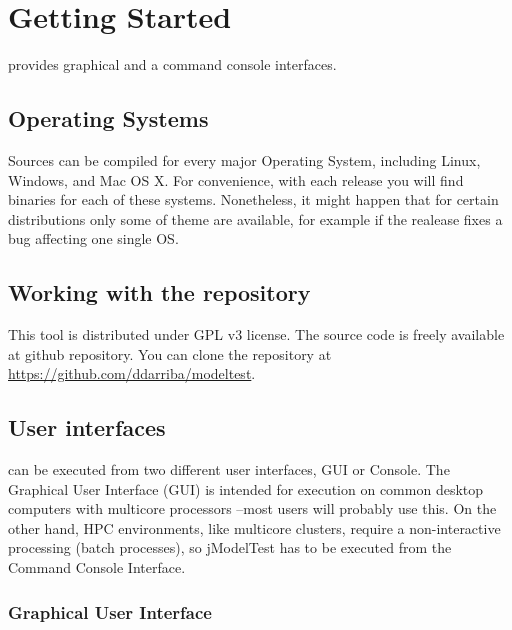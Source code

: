 \section{Getting Started}

\modeltest provides graphical and a command console interfaces.

\subsection{Operating Systems}

Sources can be compiled for every major Operating System, including Linux, Windows, and Mac OS X. For convenience, with each release you will find binaries for each of these systems.
Nonetheless, it might happen that for certain distributions only some of theme are available, for example if the realease fixes a bug affecting one single OS.

\subsection{Working with the repository}

This tool is distributed under GPL v3 license. The source code is freely available at github repository. You can clone the repository at \url{https://github.com/ddarriba/modeltest}.

\subsection{User interfaces}

\modeltest can be executed from two different user interfaces, GUI or Console.
The Graphical User Interface (GUI) is intended for execution on common desktop computers with multicore processors --most users will probably use this.
On the other hand, HPC environments, like multicore clusters, require a non-interactive processing (batch processes),
so jModelTest has to be executed from the Command Console Interface.

\subsubsection{Graphical User Interface}

